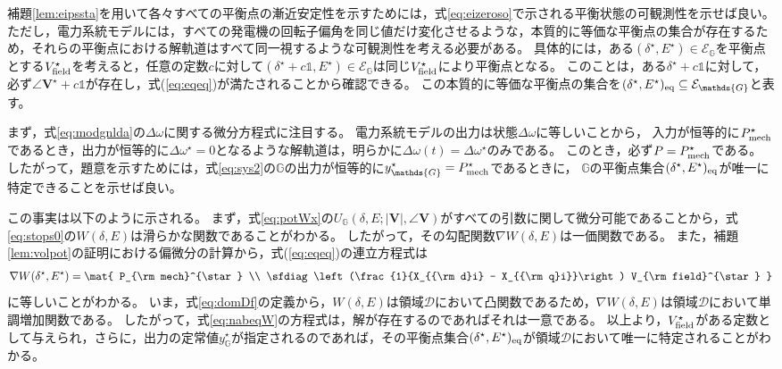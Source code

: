 \documentclass[tombow,dvipdfmx]{corona-a5}
\begin{document}
\begin{証明}
補題\ref{lem:eipssta}を用いて各々すべての平衡点の漸近安定性を示すためには，式\ref{eq:eizeroso}で示される平衡状態の可観測性を示せば良い。
ただし，電力系統モデルには，すべての発電機の回転子偏角を同じ値だけ変化させるような，本質的に等価な平衡点の集合が存在するため，それらの平衡点における解軌道はすべて同一視するような可観測性を考える必要がある。
具体的には，ある$(\delta^{\star},E^{\star}) \in \mathcal{E}_{\mathds{G}}$を平衡点とする$V_{\rm field}^{\star}$を考えると，任意の定数$c$に対して$(\delta^{\star}+c \mathds{1},E^{\star}) \in \mathcal{E}_{\mathds{G}}$は同じ$V_{\rm field}^{\star}$により平衡点となる。
このことは，ある$\delta^{\star}+c \mathds{1}$に対して，必ず$\angle \bm{V}^{\star}+c \mathds{1}$が存在し，式(\ref{eq:eqeq})が満たされることから確認できる。
この本質的に等価な平衡点の集合を$(\delta^{\star} ,E^{\star})_{\rm eq} \subseteq \mathcal{E}_{\mathds{G}}$と表す。

まず，式\ref{eq:modgnlda}の$\Delta \omega$に関する微分方程式に注目する。
電力系統モデルの出力は状態$\Delta \omega$に等しいことから，
入力が恒等的に$P_{\rm mech}^{\star}$であるとき，出力が恒等的に$\Delta \omega^{\star}=0$となるような解軌道は，明らかに$\Delta \omega(t) = \Delta \omega^{\star}$のみである。
このとき，必ず$P = P_{\rm mech}^{\star}$である。
したがって，題意を示すためには，式\ref{eq:sys2}の$\mathds{G}$の出力が恒等的に$y_{\mathds{G}}^{\star} = P_{\rm mech}^{\star}$であるときに，
$\mathds{G}$の平衡点集合$(\delta^{\star} ,E^{\star})_{\rm eq}$が唯一に特定できることを示せば良い。

この事実は以下のように示される。
まず，式\ref{eq:potWx}の$U_{\mathds{G}}(\delta, E; |\bm{V}|, \angle \bm{V})$がすべての引数に関して微分可能であることから，式\ref{eq:stops0}の$W(\delta,E)$は滑らかな関数であることがわかる。
したがって，その勾配関数$\nabla W(\delta,E)$は一価関数である。
また，補題\ref{lem:volpot}の証明における偏微分の計算から，式(\ref{eq:eqeq})の連立方程式は
\begin{align}\label{eq:nabeqW}
\nabla W(\delta^{\star},E^{\star})
=
\mat{
P_{\rm mech}^{\star} \\
\sfdiag\left(\frac{1}{X_{{\rm d}i} - X_{{\rm q}i}}\right) V_{\rm field}^{\star}
}
\end{align}
に等しいことがわかる。
いま，式\ref{eq:domDf}の定義から，$W(\delta,E)$は領域$\mathcal{D}$において凸関数であるため，$\nabla W(\delta,E)$は領域$\mathcal{D}$において単調増加関数である\cite{rockafellar1970convex,boyd2004convex}。
したがって，式\ref{eq:nabeqW}の方程式は，解が存在するのであればそれは一意である。
以上より，$V_{\rm field}^{\star}$がある定数として与えられ，さらに，出力の定常値$y_{\mathds{G}}^{\star}$が指定されるのであれば，その平衡点集合$(\delta^{\star} ,E^{\star})_{\rm eq}$が領域$\mathcal{D}$において唯一に特定されることがわかる。


\end{証明}
\end{document}
